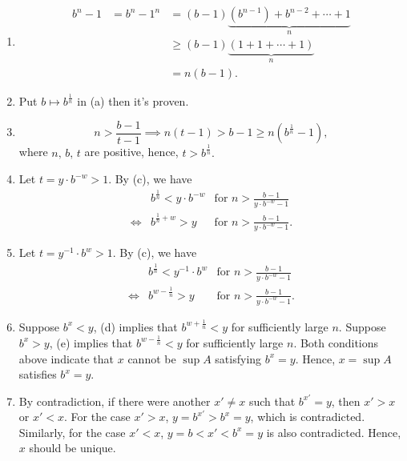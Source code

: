 \documentclass[a4pap er]{article}
\theoremstyle{plain}
\begin{document}
\begin{enumerate}[label = (\alph*)]
\item 
\[
    \begin{array}{LLL}
    b^n - 1 & = b^n - 1^ n & = (b-1)\underbrace{(b^{n-1}) + b^{n-2} + \cdots + 1}_{n} \\
        & & \geq (b-1)\underbrace{(1 + 1 + \cdots + 1)}_{n} \\
        & &= n(b-1).
    \end{array}
\]
\item Put $b \mapsto b^{\frac{1}{n}}$ in (a) then it's proven.
\item 
    \[
        n > \frac{b-1}{t-1} \implies n(t-1) > b-1 
        \geq n(b^{\frac{1}{n}} - 1),
    \]
    where $n,\, b,\, t$ are positive, hence, $t > b^{\frac{1}{n}}.$
\item
    Let $t = y\cdot b^{-w} > 1$. By (c), we have
\[
    \begin{array}{RLL}
        & b^{\frac{1}{n}} < y \cdot b^{-w} & \text{for } n > \frac{b-1}{y\cdot b^{-w}-1} \\
        \iff & b^{\frac{1}{n}+w} > y & \text{for } n > \frac{b-1}{y\cdot b^{-w}-1}.
    \end{array}
\]
\item
    Let $t = y^{-1}\cdot b^w > 1$. By (c), we have 
    \[
        \begin{array}{RLL}
            & b^{\frac{1}{n}} < y^{-1}\cdot b^w & \text{for } n > \frac{b-1}{y\cdot b^{-w}-1} \\
            \iff & b^{w-\frac{1}{n}} > y & \text{for } n > \frac{b-1}{y\cdot b^{-w}-1}.
        \end{array}
    \]
\item Suppose $b^x < y$, (d) implies that $b^{w+\frac{1}{n}}
    < y$ for sufficiently large $n$. 
    Suppose $b^x > y$, (e) implies that $b^{w - \frac{1}{n}}
    < y$ for sufficiently large $n$.
Both conditions above indicate that $x$ cannot be $\sup A$
satisfying $b^x = y$.
    Hence, $x = \sup A$ satisfies $b^x=y$.
\item
By contradiction, if there were another $x' \neq x$
such that $b^{x'} = y$, then $x'>x$ or $x'<x$.
For the case $x'>x$, $y=b^{x'} > b^x = y$, which is contradicted. 
Similarly, for the case $x' < x$, $y=b<{x'} < b^x=y$ is also
contradicted. Hence, $x$ should be unique.
\end{enumerate}
\end{document}
